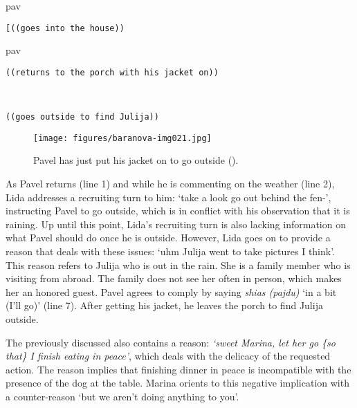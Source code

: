 \documentclass[output=paper,modfonts,nonflat]{langsci/langscibook}
\begin{document}
%
\begin{transbox}{10}{pav}%
\begin{verbatim}
[((goes into the house))
\end{verbatim}
\end{transbox}
%
%
\begin{transbox}{12}{pav}%
\begin{verbatim}
((returns to the porch with his jacket on))
\end{verbatim}
\end{transbox}\vspace{-1mm}
%
\begin{transbox}{13}{~}
\begin{verbatim}
((goes outside to find Julija))
\end{verbatim}
\end{transbox}\bigskip

\begin{figure}
\texttt{[image: figures/baranova-img021.jpg]}
\caption{Pavel has just put his jacket on to go outside ().}
\label{fig:baranova:21}
\end{figure}

\largerpage
As Pavel returns (line 1) and while he is commenting on the weather (line 2), Lida addresses a recruiting turn to him: ‘take a look go out behind the fen-’, instructing Pavel to go outside, which is in conflict with his observation that it is raining. Up until this point, Lida’s recruiting turn is also lacking information on what Pavel should do once he is outside. However, Lida goes on to provide a reason that deals with these issues: ‘uhm Julija went to take pictures I think’. This reason refers to Julija who is out in the rain. She is a family member who is visiting from abroad. The family does not see her often in person, which makes her an honored guest. Pavel agrees to comply by saying \textit{shias (pajdu)} ‘in a bit (I’ll go)’ (line 7). After getting his jacket, he leaves the porch to find Julija outside.

The previously discussed  also contains a reason: \textit{‘sweet Marina, let her go \{so that\} I finish eating in peace’}, which deals with the delicacy of the requested action. The reason implies that finishing dinner in peace is incompatible with the presence of the dog at the table. Marina orients to this negative implication with a counter-reason ‘but we aren’t doing anything to you’.\\
\end{document}

